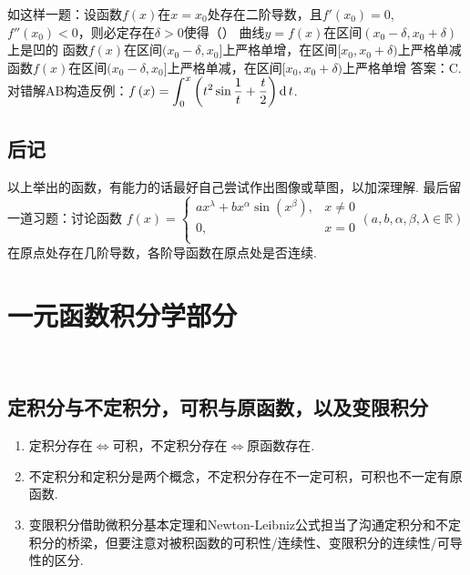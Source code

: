     如这样一题：设函数$f(x)$在$x = x_0$处存在二阶导数，且$f'(x_0)=0$, $f''(x_0)<0$，则必定存在$\delta > 0$使得（\qquad）
    {曲线$y=f(x)$在区间$(x_0 - \delta, x_0 + \delta)$上是凹的}
    {函数$f(x)$在区间$(x_0-\delta,x_0]$上严格单增，在区间$[x_0, x_0+\delta)$上严格单减}
    {函数$f(x)$在区间$(x_0-\delta,x_0]$上严格单减，在区间$[x_0, x_0+\delta)$上严格单增}
    答案：C. 对错解AB构造反例：$f\left( x \right) = \displaystyle\int_0^x{\left( t^2\sin \frac{1}{t}+\frac{t}{2} \right) \operatorname{\mathop{}\!\mathrm{d}} t}$.

  \subsection{后记}
    \hspace*{2em}以上举出的函数，有能力的话最好自己尝试作出图像或草图，以加深理解.
    最后留一道习题：讨论函数
    $f\left( x \right) =\begin{cases}
      ax^{\lambda}+bx^{\alpha}\sin \left( x^{\beta} \right), & x\ne 0 \\
      0, & x=0 \\
    \end{cases}\left( a,b,\alpha ,\beta ,\lambda \in \mathbb{R} \right)$
    在原点处存在几阶导数，各阶导函数在原点处是否连续.

\section{一元函数积分学部分}
~ \subsection{定积分与不定积分，可积与原函数，以及变限积分}
    \begin{enumerate}[label=(\arabic*)]
      \item 定积分存在$\Leftrightarrow$可积，不定积分存在$\Leftrightarrow$原函数存在.
      \item 不定积分和定积分是两个概念，不定积分存在不一定可积，可积也不一定有原函数.
      \item 变限积分借助微积分基本定理和Newton-Leibniz公式担当了沟通定积分和不定积分的桥梁，但要注意对被积函数的可积性/连续性、变限积分的连续性/可导性的区分.
    \end{enumerate}

